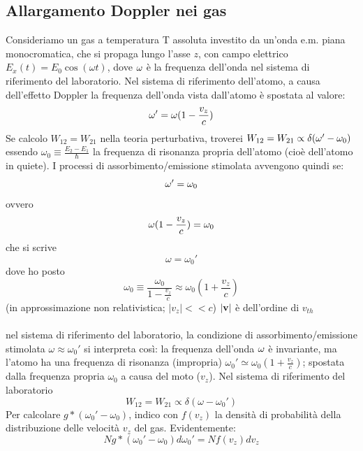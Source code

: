 \subsection{Allargamento Doppler nei gas}
Consideriamo un gas a temperatura T assoluta investito  da un'onda e.m. piana monocromatica, che si propaga lungo l'asse $z$, con campo elettrico $E_x(t) = E_0 \cos(\omega t)$, dove $\omega$ è la frequenza dell'onda nel sistema di riferimento del laboratorio.
Nel sistema di riferimento dell'atomo, a causa dell'effetto Doppler la frequenza dell'onda vista dall'atomo è spostata al valore:
\begin{equation*}
\omega' = \omega (1 - \frac{v_z}{c})
\end{equation*}
Se calcolo $W_{12} = W_{21}$ nella teoria perturbativa, troverei $W_{12} = W_{21} \propto \delta(\omega' - \omega_0)$ essendo $\omega_0 \equiv \frac{E_2 - E_1}{\hbar}$ la frequenza di risonanza propria dell'atomo (cioè dell'atomo in quiete). I processi di assorbimento/emissione stimolata avvengono quindi se:
\begin{equation*}
\omega' = \omega_0
\end{equation*}
ovvero
\begin{equation*}
\omega(1 - \frac{v_z}{c}) = \omega_0
\end{equation*}
che si scrive
\begin{equation*}
\omega = \omega_0'
\end{equation*}
dove ho posto
\begin{equation*}
\omega_0 \equiv \frac{\omega_0}{1-\frac{v_z}{c}} \approx \omega_0 \left(1 + \frac{v_z}{c} \right)
\end{equation*}
(in approssimazione non relativistica; $|v_z| << c$)
$|\mathbf{v}|$ è dell'ordine di $v_{th}$\\
\\
nel sistema di riferimento del laboratorio, la condizione di assorbimento/emissione stimolata $\omega \approx \omega_0'$ si interpreta così: la frequenza dell'onda $\omega$ è invariante, ma l'atomo ha una frequenza di risonanza (impropria) $\omega_0' \simeq \omega_0 (1 + \frac{v_z}{c})$; spostata dalla frequenza propria $\omega_0$ a causa del moto ($v_z$). Nel sistema di riferimento del laboratorio
\begin{equation*}
W_{12} = W_{21} \propto \delta(\omega - \omega_0')
\end{equation*}
Per calcolare $g*(\omega_0' - \omega_0)$, indico con $f(v_z)$ la densità di probabilità della distribuzione delle velocità $v_z$ del gas. Evidentemente:
\begin{equation*}
Ng*(\omega_0' - \omega_0) d\omega_0' = N f(v_z) dv_z
\end{equation*}

